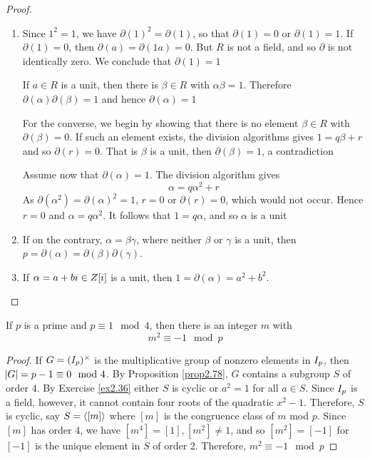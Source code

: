 \documentclass[11pt]{article}
\begin{document}
\begin{proof}
\begin{enumerate}
\item Since \(1^2=1\), we have \(\partial(1)^2=\partial(1)\), so that \(\partial(1)=0\) or
\(\partial(1)=1\). If \(\partial(1)=0\), then \(\partial(a)=\partial(1a)=0\). But \(R\) is not a
field, and so \(\partial\) is not identically zero. We conclude that \(\partial(1)=1\)

If \(a\in R\) is a unit, then there is \(\beta\in R\) with
\(\alpha\beta=1\). Therefore \(\partial(\alpha)\partial(\beta)=1\) and hence \(\partial(\alpha)=1\)

For the converse, we begin by showing that there is no element \(\beta\in
      R\) with 
\(\partial(\beta)=0\). If such an element exists, the division algorithms gives 
\(1=q\beta+r\) and so \(\partial(r)=0\). That is \(\beta\) is a unit, then \(\partial(\beta)=1\), a
contradiction

Assume now that \(\partial(\alpha)=1\). The division algorithm gives
\begin{equation*}
\alpha=q\alpha^2+r
\end{equation*}
As \(\partial(\alpha^2)=\partial(\alpha)^2=1\), \(r=0\) or \(\partial(r)=0\), which would not occur.
Hence \(r=0\) and \(\alpha=q\alpha^2\). It follows that \(1=q\alpha\), and
so \(\alpha\) is a unit
\item If on the contrary, \(\alpha=\beta\gamma\), where neither \(\beta\) or
\(\gamma\) is a unit, then \(p=\partial(\alpha)=\partial(\beta)\partial(\gamma)\).
\item If \(\alpha=a+bi\in\relax{Z}[i]\) is a unit, then \(1=\partial(\alpha)=a^2+b^2\).
\end{enumerate}
\end{proof}

\begin{lemma}[]
If \(p\) is a prime and \(p\equiv 1\mod 4\), then there is an integer \(m\) with
\begin{equation*}
 m^2\equiv -1\mod p
\end{equation*}
\end{lemma}
\begin{proof}
If \(G=(\relax{I}_p)^\times\) is the multiplicative group of nonzero elements in
\(\relax{I}_p\), then \(\abs{G}=p-1\equiv 0\mod 4\). By Proposition \ref{prop2.78},
\(G\) contains a subgroup \(S\) of order \(4\). By Exercise \ref{ex2.36} either \(S\)
is cyclic or \(a^2=1\) for all \(a\in S\). Since \(\relax{I}_p\) is a field,
however, it cannot contain four roots of the quadratic \(x^2-1\). Therefore,
\(S\) is cyclic, say \(S=\langle[m]\rangle\) where \([m]\) is the congruence class of
\(m\) mod \(p\). Since \([m]\) has order 4, we have \([m^4]=[1],[m^2]\neq1\), and
so \([m^2]=[-1]\) for \([-1]\)  is the unique element in \(S\) of order 2.
Therefore, \(m^2\equiv -1\mod p\)
\end{proof}
\end{document}
